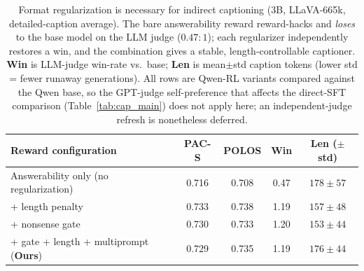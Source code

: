 \begin{table}[t]
\caption{Format regularization is necessary for indirect captioning (3B, LLaVA-665k, detailed-caption average).
The bare answerability reward reward-hacks and \emph{loses} to the base model on the LLM judge ($0.47\!:\!1$);
each regularizer independently restores a win, and the combination gives a stable, length-controllable captioner.
\textbf{Win} is LLM-judge win-rate vs.\ base; \textbf{Len} is mean$\pm$std caption tokens (lower std = fewer
runaway generations). All rows are Qwen-RL variants compared against the Qwen base, so the GPT-judge
self-preference that affects the direct-SFT comparison (Table~\ref{tab:cap_main}) does not apply here; an
independent-judge refresh is nonetheless deferred.}
\label{tab:cap_ablation}
\begin{center}
\small
\begin{tabular}{lcccc}
\toprule
Reward configuration & PAC-S & POLOS & Win & Len ($\pm$std) \\
\midrule
Answerability only (no regularization) & 0.716 & 0.708 & 0.47 & $178\pm57$ \\
\; + length penalty                    & 0.733 & 0.738 & 1.19 & $157\pm48$ \\
\; + nonsense gate                     & 0.730 & 0.733 & 1.20 & $153\pm44$ \\
\; + gate + length + multiprompt (\textbf{Ours}) & 0.729 & 0.735 & 1.19 & $176\pm44$ \\
\bottomrule
\end{tabular}
\end{center}
\end{table}
